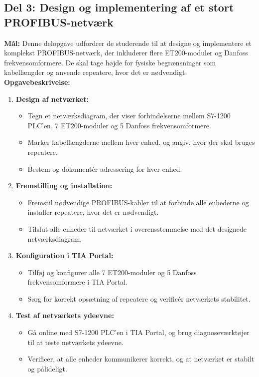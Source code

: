 \subsection*{Del 3: Design og implementering af et stort PROFIBUS-netværk}
\textbf{Mål:} Denne delopgave udfordrer de studerende til at designe og implementere et komplekst PROFIBUS-netværk, der inkluderer flere ET200-moduler og Danfoss frekvensomformere. De skal tage højde for fysiske begrænsninger som kabellængder og anvende repeatere, hvor det er nødvendigt.
\newline\newline
\noindent\textbf{Opgavebeskrivelse:}
\begin{enumerate}
	\item \textbf{Design af netværket:}
	\begin{itemize}
		\item Tegn et netværksdiagram, der viser forbindelserne mellem S7-1200 PLC’en, 7 ET200-moduler og 5 Danfoss frekvensomformere.
		\item Marker kabellængderne mellem hver enhed, og angiv, hvor der skal bruges repeatere.
		\item Bestem og dokumentér adressering for hver enhed.
	\end{itemize}
	\item \textbf{Fremstilling og installation:}
	\begin{itemize}
		\item Fremstil nødvendige PROFIBUS-kabler til at forbinde alle enhederne og installer repeatere, hvor det er nødvendigt.
		\item Tilslut alle enheder til netværket i overensstemmelse med det designede netværksdiagram.
	\end{itemize}
	\item \textbf{Konfiguration i TIA Portal:}
	\begin{itemize}
		\item Tilføj og konfigurer alle 7 ET200-moduler og 5 Danfoss frekvensomformere i TIA Portal.
		\item Sørg for korrekt opsætning af repeatere og verificér netværkets stabilitet.
	\end{itemize}
	\item \textbf{Test af netværkets ydeevne:}
	\begin{itemize}
		\item Gå online med S7-1200 PLC’en i TIA Portal, og brug diagnoseværktøjer til at teste netværkets ydeevne.
		\item Verificer, at alle enheder kommunikerer korrekt, og at netværket er stabilt og pålideligt.
	\end{itemize}
\end{enumerate}

